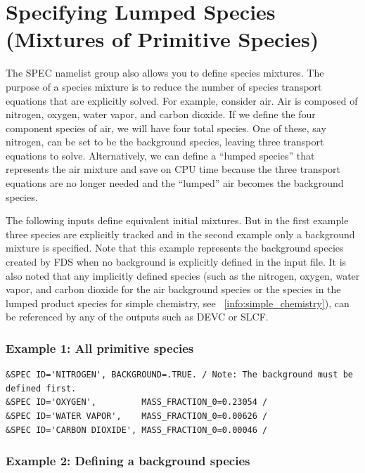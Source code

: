 \documentclass[11pt]{book}
\begin{document}
\section{Specifying Lumped Species (Mixtures of Primitive Species)}
\label{info:lumped}

The {\ct SPEC} namelist group also allows you to define species mixtures. The purpose of a species mixture is to reduce the number of species transport equations that are explicitly solved. For example, consider air. Air is composed of nitrogen, oxygen, water vapor, and carbon dioxide. If we define the four component species of air, we will have four total species. One of these, say nitrogen, can be set to be the background species, leaving three transport equations to solve. Alternatively, we can define a ``lumped species'' that represents the air mixture and save on CPU time because the three transport equations are no longer needed and the ``lumped'' air becomes the background species.

The following inputs define equivalent initial mixtures. But in the first example three species are explicitly tracked and in the second example only a background mixture is specified.  Note that this example represents the background species created by FDS when no background is explicitly defined in the input file.  It is also noted that any implicitly defined species (such as the nitrogen, oxygen, water vapor, and carbon dioxide for the air background species or the species in the lumped product species for simple chemistry, see ~\ref{info:simple_chemistry}), can be referenced by any of the outputs such as {\ct DEVC} or {\ct SLCF}.

\subsubsection{Example 1: All primitive species}

\begin{lstlisting}
&SPEC ID='NITROGEN', BACKGROUND=.TRUE. / Note: The background must be defined first.
&SPEC ID='OXYGEN',         MASS_FRACTION_0=0.23054 /
&SPEC ID='WATER VAPOR',    MASS_FRACTION_0=0.00626 /
&SPEC ID='CARBON DIOXIDE', MASS_FRACTION_0=0.00046 /
\end{lstlisting}

\subsubsection{Example 2: Defining a background species}
\end{document}
